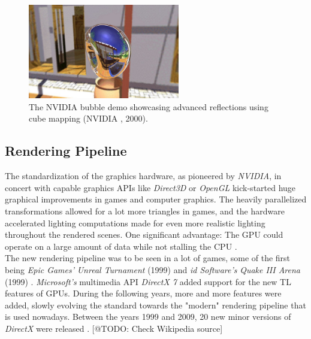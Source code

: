 \begin{figure}[h]
    \centering
    \includegraphics[width=250px]{images/graphics/bubble-reflection-effects-demo.jpg}
    \caption{The NVIDIA bubble demo showcasing advanced reflections using cube mapping (NVIDIA \cite{NVIDIABubble}, 2000).}
    \label{fig:bubble-reflection-demo}
\end{figure}


\subsection{Rendering Pipeline}

The standardization of the graphics hardware, as pioneered by \emph{NVIDIA}, in concert with capable 
graphics \ac{API}s like \emph{Direct3D} or \emph{OpenGL} kick-started huge graphical improvements in 
games and computer graphics. The heavily parallelized transformations allowed for a lot more triangles 
in games, and the hardware accelerated lighting computations made for even more realistic lighting 
throughout the rendered scenes. One significant advantage: The \ac{GPU} could operate on a large amount 
of data while not stalling the \ac{CPU} \cite{Fenno2024}.\\

\noindent
The new rendering pipeline was to be seen in a lot of games, some of the first being \emph{Epic Games'} 
\emph{Unreal Turnament} (1999) and \emph{id Software's} \emph{Quake III Arena} (1999) \cite{UnrealTurnament, 
Quake3Arena}. \emph{Microsoft's} multimedia \ac{API} \emph{DirectX 7} added support for the new \ac{TL} 
features of \ac{GPU}s. During the following years, more and more features were added, slowly evolving the 
standard towards the "modern" rendering pipeline that is used nowadays. Between the years 1999 and 2009,
20 new minor versions of \emph{DirectX} were released \cite{WikiDirectX}. [@TODO: Check Wikipedia source] 

